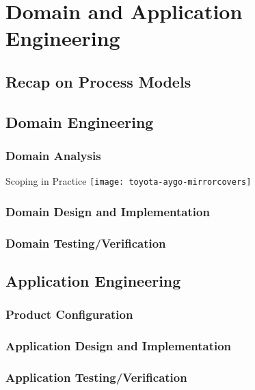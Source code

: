 \documentclass[
	aspectratio=169, %
	8pt, %
	handout, %
]{beamer}
\subtitle{8. Development Process}
\author{Thomas Thüm}
\begin{document}


\section{Domain and Application Engineering}

\subsection{Recap on Process Models}
\subsection{Domain Engineering}
\subsubsection{Domain Analysis}
\begin{frame}{Scoping in Practice}
	\centering\texttt{[image: toyota-aygo-mirrorcovers]}
\end{frame}

\subsubsection{Domain Design and Implementation}
\subsubsection{Domain Testing/Verification}
\subsection{Application Engineering}
\subsubsection{Product Configuration}
\subsubsection{Application Design and Implementation}
\subsubsection{Application Testing/Verification}
\end{document}
